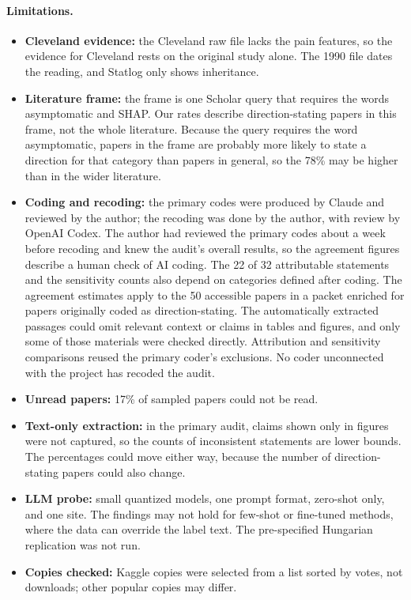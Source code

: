 \documentclass[11pt]{article}
\begin{document}
\paragraph{Limitations.}
\begin{itemize}
\item \textbf{Cleveland evidence:} the Cleveland raw file lacks the pain features, so the evidence for Cleveland rests on the original study alone. The 1990 file dates the reading, and Statlog only shows inheritance.
\item \textbf{Literature frame:} the frame is one Scholar query that requires the words asymptomatic and SHAP. Our rates describe direction-stating papers in this frame, not the whole literature. Because the query requires the word asymptomatic, papers in the frame are probably more likely to state a direction for that category than papers in general, so the 78\% may be higher than in the wider literature.
\item \textbf{Coding and recoding:} the primary codes were produced by Claude and reviewed by the author; the recoding was done by the author, with review by OpenAI Codex. The author had reviewed the primary codes about a week before recoding and knew the audit's overall results, so the agreement figures describe a human check of AI coding. The 22 of 32 attributable statements and the sensitivity counts also depend on categories defined after coding. The agreement estimates apply to the 50 accessible papers in a packet enriched for papers originally coded as direction-stating. The automatically extracted passages could omit relevant context or claims in tables and figures, and only some of those materials were checked directly. Attribution and sensitivity comparisons reused the primary coder's exclusions. No coder unconnected with the project has recoded the audit.
\item \textbf{Unread papers:} 17\% of sampled papers could not be read.
\item \textbf{Text-only extraction:} in the primary audit, claims shown only in figures were not captured, so the counts of inconsistent statements are lower bounds. The percentages could move either way, because the number of direction-stating papers could also change.
\item \textbf{LLM probe:} small quantized models, one prompt format, zero-shot only, and one site. The findings may not hold for few-shot or fine-tuned methods, where the data can override the label text. The pre-specified Hungarian replication was not run.
\item \textbf{Copies checked:} Kaggle copies were selected from a list sorted by votes, not downloads; other popular copies may differ.
\end{itemize}
\end{document}
